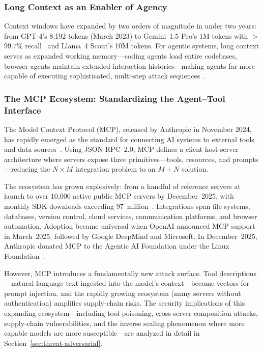 \subsubsection{Long Context as an Enabler of Agency}
\label{sec:cap-context}

Context windows have expanded by two orders of magnitude in under two years: from GPT-4's 8,192 tokens (March 2023) to Gemini~1.5 Pro's 1M tokens with $>$99.7\% recall~\cite{gemini15} and Llama~4 Scout's 10M tokens. For agentic systems, long context serves as expanded working memory---coding agents load entire codebases, browser agents maintain extended interaction histories---making agents far more capable of executing sophisticated, multi-step attack sequences~\cite{anthropic2024effective}.


\subsubsection{The MCP Ecosystem: Standardizing the Agent--Tool Interface}
\label{sec:cap-mcp}

The Model Context Protocol (MCP), released by Anthropic in November 2024, has rapidly emerged as the standard for connecting AI systems to external tools and data sources~\cite{anthropic2024mcp}. Using JSON-RPC~2.0, MCP defines a client-host-server architecture where servers expose three primitives---tools, resources, and prompts---reducing the $N \times M$ integration problem to an $M+N$ solution.

The ecosystem has grown explosively: from a handful of reference servers at launch to over 10,000 active public MCP servers by December~2025, with monthly SDK downloads exceeding 97~million~\cite{mcp2025anniversary}. Integrations span file systems, databases, version control, cloud services, communication platforms, and browser automation. Adoption became universal when OpenAI announced MCP support in March~2025, followed by Google DeepMind and Microsoft. In December~2025, Anthropic donated MCP to the Agentic AI Foundation under the Linux Foundation~\cite{anthropic2025aaif}.

However, MCP introduces a fundamentally new attack surface. Tool descriptions---natural language text ingested into the model's context---become vectors for prompt injection, and the rapidly growing ecosystem (many servers without authentication) amplifies supply-chain risks. The security implications of this expanding ecosystem---including tool poisoning, cross-server composition attacks, supply-chain vulnerabilities, and the inverse scaling phenomenon where more capable models are more susceptible---are analyzed in detail in Section~\ref{sec:threat-adversarial}.



